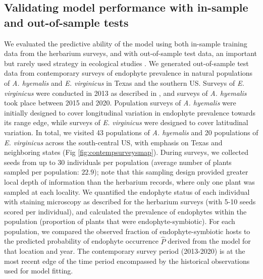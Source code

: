\documentclass[11pt]{article}
\let\cite\citep
\begin{document}
\subsection*{Validating model performance with in-sample and out-of-sample tests}
We evaluated the predictive ability of the model using both in-sample training data from the herbarium surveys, and with out-of-sample test data, an important but rarely used strategy in ecological studies \cite{tredennick2021practical, lee2024phenological}.
We generated out-of-sample test data from contemporary surveys of endophyte prevalence in natural populations of \emph{A. hyemalis} and \emph{E. virginicus} in Texas and the southern US. 
Surveys of \emph{E. virginicus} were conducted in 2013 as described in \citet{sneck2017variation}, and surveys of \emph{A. hyemalis} took place between 2015 and 2020.
Population surveys of \emph{A. hyemalis} were initially designed to cover longitudinal variation in endophyte prevalence towards its range edge, while surveys of \emph{E. virginicus} were designed to cover latitudinal variation. 
In total, we visited 43 populations of \emph{A. hyemalis} and 20 populations of \emph{E. virginicus} across the south-central US, with emphasis on Texas and neighboring states (Fig \ref{fig:contempsurveysmap}).
During surveys, we collected seeds from up to 30 individuals per population (average number of plants sampled per population: $22.9$); note that this sampling design provided greater local depth of information than the herbarium records, where only one plant was sampled at each locality.
We quantified the endophyte status of each individual with staining microscopy as described for the herbarium surveys (with 5-10 seeds scored per individual), and calculated the prevalence of endophytes within the population (proportion of plants that were endophyte-symbiotic).
For each population, we compared the observed fraction of endophyte-symbiotic hosts to the predicted probability of endophyte occurrence $\hat{P}$ derived from the model for that location and year. 
The contemporary survey period (2013-2020) is at the most recent edge of the time period encompassed by the historical observations used for model fitting.
\end{document}
